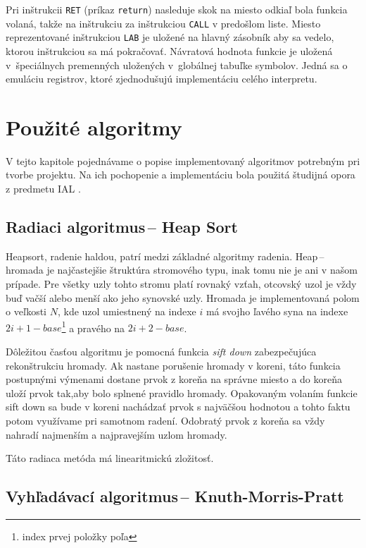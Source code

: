 \documentclass[11pt,a4paper]{article}
\begin{document}
	
	Pri inštrukcii \texttt{RET} (príkaz \texttt{return}) nasleduje skok na
	miesto odkiaľ bola funkcia volaná, takže na inštrukciu za inštrukciou
	\texttt{CALL} v predošlom liste. Miesto reprezentované inštrukciou
	\texttt{LAB} je uložené na hlavný zásobník aby sa vedelo, ktorou inštrukciou
	sa má pokračovať. Návratová hodnota funkcie je uložená v~špeciálnych
	premenných uložených v~globálnej tabuľke symbolov. Jedná sa o emuláciu
	registrov, ktoré zjednodušujú implementáciu celého interpretu.
	
	
	
	
	\section{Použité algoritmy}
	\label{algoritmy}
	
	V tejto kapitole pojednávame o popise implementovaný algoritmov potrebným pri tvorbe projektu. Na ich pochopenie a implementáciu bola použitá študijná opora z predmetu IAL \cite{opora}.
	
	\subsection{Radiaci algoritmus\,-- Heap Sort}
	
	Heapsort, radenie haldou, patrí medzi základné algoritmy radenia. Heap\,-- hromada je najčastejšie štruktúra stromového typu, inak tomu nie je ani v našom prípade. Pre všetky uzly tohto stromu platí rovnaký vzťah, otcovský uzol je vždy buď vačší alebo menší ako jeho synovské uzly. Hromada je implementovaná polom o veľkosti $N$, kde uzol umiestnený na indexe $i$ má svojho ľavého syna na indexe $2i+1-base$\footnote{index prvej položky poľa} a pravého na $2i+2-base$.
	
	Dôležitou časťou algoritmu je pomocná funkcia \textit{sift down} zabezpečujúca rekonštrukciu hromady. Ak nastane porušenie hromady v koreni, táto funkcia postupnými výmenami dostane prvok z koreňa na správne miesto a do koreňa uloží prvok tak,aby bolo splnené pravidlo hromady. Opakovaným volaním funkcie sift down sa bude v koreni nachádzať prvok s najväčšou hodnotou a tohto faktu potom využívame pri samotnom radení. Odobratý prvok z koreňa sa vždy nahradí najmenším a najpravejším uzlom hromady.
	
	Táto radiaca metóda má linearitmickú zložitosť.
	
	\subsection{Vyhľadávací algoritmus\,-- Knuth-Morris-Pratt}
\end{document}
